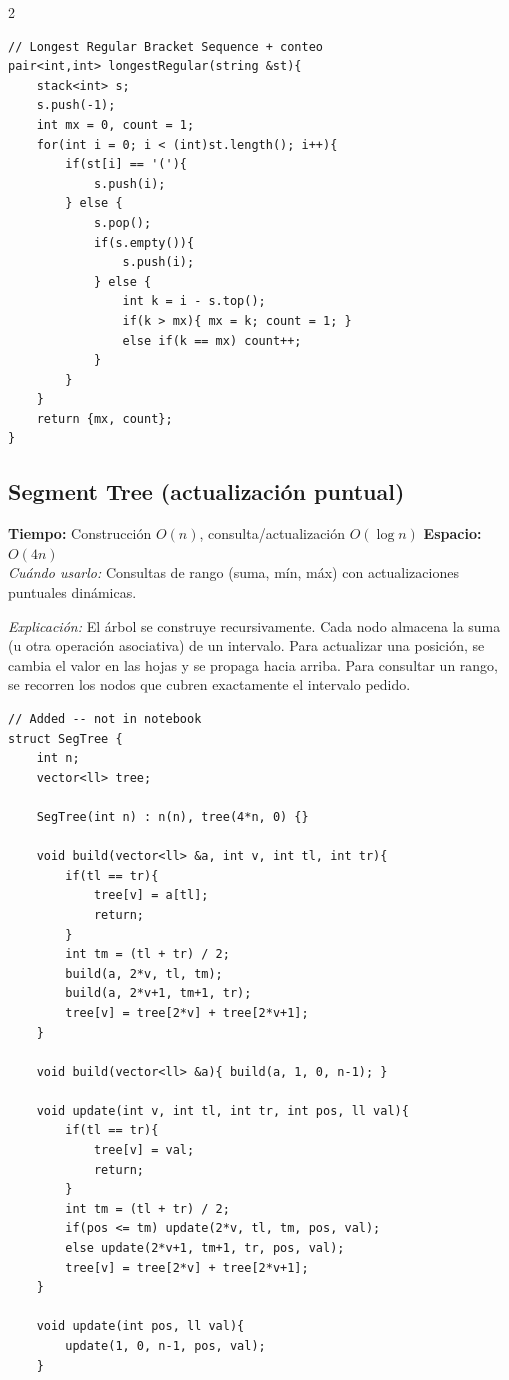 \documentclass[10pt,a4paper]{article}
\begin{document}
\begin{multicols}{2}
\begin{lstlisting}
// Longest Regular Bracket Sequence + conteo
pair<int,int> longestRegular(string &st){
    stack<int> s;
    s.push(-1);
    int mx = 0, count = 1;
    for(int i = 0; i < (int)st.length(); i++){
        if(st[i] == '('){
            s.push(i);
        } else {
            s.pop();
            if(s.empty()){
                s.push(i);
            } else {
                int k = i - s.top();
                if(k > mx){ mx = k; count = 1; }
                else if(k == mx) count++;
            }
        }
    }
    return {mx, count};
}
\end{lstlisting}

\subsection{Segment Tree (actualizaci\'on puntual)}
\textbf{Tiempo:} Construcci\'on $O(n)$, consulta/actualizaci\'on $O(\log n)$ \quad \textbf{Espacio:} $O(4n)$\\
\textit{Cu\'ando usarlo:} Consultas de rango (suma, m\'in, m\'ax) con actualizaciones puntuales din\'amicas.

\textit{Explicación:} El árbol se construye recursivamente. Cada nodo almacena la suma (u otra operación asociativa) de un intervalo. Para actualizar una posición, se cambia el valor en las hojas y se propaga hacia arriba. Para consultar un rango, se recorren los nodos que cubren exactamente el intervalo pedido.

\begin{lstlisting}
// Added -- not in notebook
struct SegTree {
    int n;
    vector<ll> tree;

    SegTree(int n) : n(n), tree(4*n, 0) {}

    void build(vector<ll> &a, int v, int tl, int tr){
        if(tl == tr){
            tree[v] = a[tl];
            return;
        }
        int tm = (tl + tr) / 2;
        build(a, 2*v, tl, tm);
        build(a, 2*v+1, tm+1, tr);
        tree[v] = tree[2*v] + tree[2*v+1];
    }

    void build(vector<ll> &a){ build(a, 1, 0, n-1); }

    void update(int v, int tl, int tr, int pos, ll val){
        if(tl == tr){
            tree[v] = val;
            return;
        }
        int tm = (tl + tr) / 2;
        if(pos <= tm) update(2*v, tl, tm, pos, val);
        else update(2*v+1, tm+1, tr, pos, val);
        tree[v] = tree[2*v] + tree[2*v+1];
    }

    void update(int pos, ll val){
        update(1, 0, n-1, pos, val);
    }


\end{lstlisting}
\end{multicols}
\end{document}
